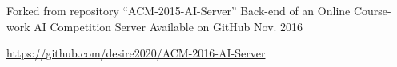\begin{cventries}
  \cventry
    {Forked from repository ``ACM-2015-AI-Server''} %
    {Back-end of an Online Course-work AI Competition Server} %
    {Available on GitHub} %
    {Nov. 2016} %
    {
      \begin{cvitems} %
        \item {\url{https://github.com/desire2020/ACM-2016-AI-Server}}
      \end{cvitems}
    }


\end{cventries}
